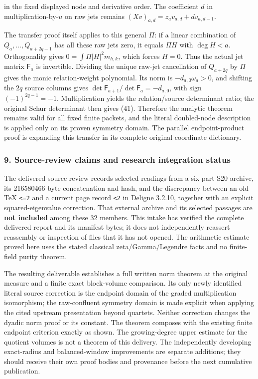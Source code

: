 in the fixed displayed node and derivative order. The coefficient \(d\) in multiplication-by-\(u\) on raw jets remains \((Xv)_{a,d}=z_av_{a,d}+dv_{a,d-1}\).

The transfer proof itself applies to this general \(\Pi\): if a linear combination of \(Q_a,\ldots,Q_{a+2q-1}\) has all these raw jets zero, it equals \(\Pi H\) with \(\deg H<a\). Orthogonality gives \(0=\int\Pi|H|^2m_{h,k}\), which forces \(H=0\). Thus the actual jet matrix \(\mathsf F_a\) is invertible. Dividing the unique raw-jet cancellation of \(Q_{a+2q}\) by \(\Pi\) gives the monic relation-weight polynomial. Its norm is \(-d_{a,0}\omega_a>0\), and shifting the \(2q\) source columns gives \(\det\mathsf F_{a+1}/\det\mathsf F_a=-d_{a,0}\), with sign \((-1)^{2q-1}=-1\). Multiplication yields the relation/source determinant ratio; the original Schur determinant then gives (41). Therefore the analytic theorem remains valid for all fixed finite packets, and the literal doubled-node description is applied only on its proven symmetry domain. The parallel endpoint-product proof is expanding this transfer in its complete original coordinate dictionary.

\subsubsection{9. Source-review claims and research integration status}\label{endpoint-arithmetic_intake--source-review-claims-and-research-integration-status}

The delivered source review records selected readings from a six-part S20 archive, its 216580466-byte concatenation and hash, and the discrepancy between an old TeX \texttt{\textless{}=2} and a current page record \texttt{\textless{}2} in Deligne 3.2.10, together with an explicit squared-eigenvalue correction. That external archive and its selected passages are \textbf{not included} among these 32 members. This intake has verified the complete delivered report and its manifest bytes; it does not independently reassert reassembly or inspection of files that it has not opened. The arithmetic estimate proved here uses the stated classical zeta/Gamma/Legendre facts and no finite-field purity theorem.

The resulting deliverable establishes a full written norm theorem at the original measure and a finite exact block-volume comparison. Its only newly identified literal source correction is the endpoint domain of the graded multiplication isomorphism; the raw-confluent symmetry domain is made explicit when applying the cited upstream presentation beyond quartets. Neither correction changes the dyadic norm proof or its constant. The theorem composes with the existing finite endpoint criterion exactly as shown. The growing-degree upper estimate for the quotient volumes is not a theorem of this delivery. The independently developing exact-radius and balanced-window improvements are separate additions; they should receive their own proof bodies and provenance before the next cumulative publication.

